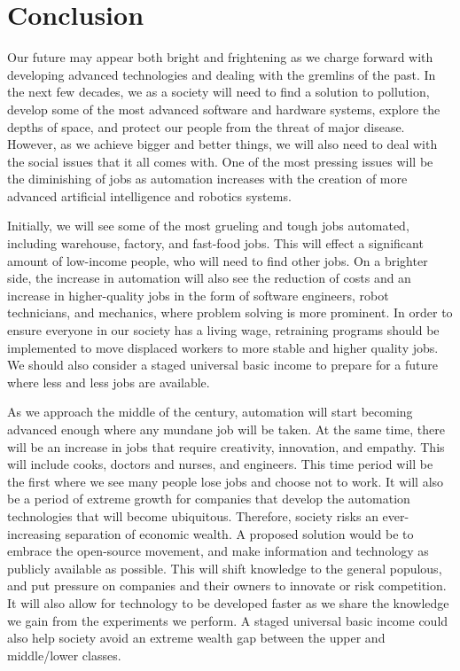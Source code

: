 \section{Conclusion}
\label{sec:conclusion}

Our future may appear both bright and frightening as we charge forward with developing advanced technologies and dealing with the gremlins of the past. In the next few decades, we as a society will need to find a solution to pollution, develop some of the most advanced software and hardware systems, explore the depths of space, and protect our people from the threat of major disease. However, as we achieve bigger and better things, we will also need to deal with the social issues that it all comes with. One of the most pressing issues will be the diminishing of jobs as automation increases with the creation of more advanced artificial intelligence and robotics systems.

Initially, we will see some of the most grueling and tough jobs automated, including warehouse, factory, and fast-food jobs. This will effect a significant amount of low-income people, who will need to find other jobs. On a brighter side, the increase in automation will also see the reduction of costs and an increase in higher-quality jobs in the form of software engineers, robot technicians, and mechanics, where problem solving is more prominent. In order to ensure everyone in our society has a living wage, retraining programs should be implemented to move displaced workers to more stable and higher quality jobs. We should also consider a staged universal basic income to prepare for a future where less and less jobs are available.

As we approach the middle of the century, automation will start becoming advanced enough where any mundane job will be taken. At the same time, there will be an increase in jobs that require creativity, innovation, and empathy. This will include cooks, doctors and nurses, and engineers. This time period will be the first where we see many people lose jobs and choose not to work. It will also be a period of extreme growth for companies that develop the automation technologies that will become ubiquitous. Therefore, society risks an ever-increasing separation of economic wealth. A proposed solution would be to embrace the open-source movement, and make information and technology as publicly available as possible. This will shift knowledge to the general populous, and put pressure on companies and their owners to innovate or risk competition. It will also allow for technology to be developed faster as we share the knowledge we gain from the experiments we perform. A staged universal basic income could also help society avoid an extreme wealth gap between the upper and middle/lower classes.

